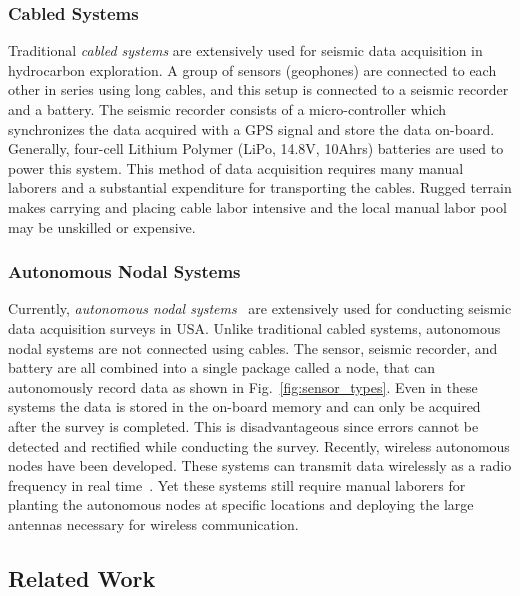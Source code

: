 \subsubsection{Cabled Systems}
 Traditional \emph{cabled systems} are extensively used for seismic data acquisition in hydrocarbon exploration. A group of sensors (geophones) are connected to each other in series using long cables, and this setup is connected to a seismic recorder and a battery. The seismic recorder consists of a micro-controller which synchronizes the data acquired with a GPS signal and store the data on-board. Generally, four-cell Lithium Polymer (LiPo, 14.8V, 10Ahrs) batteries are used to power this system. This method of data acquisition requires many manual laborers and a substantial expenditure for transporting the cables. 
 Rugged terrain makes carrying and placing cable labor intensive and the local manual labor pool may be unskilled or expensive.
   
 \subsubsection{Autonomous Nodal Systems}
 Currently, \emph{autonomous nodal systems}~\cite{wood1998distributed} are extensively used for conducting seismic data acquisition surveys in USA. Unlike traditional cabled systems, autonomous nodal systems are not connected using cables. The sensor, seismic recorder, and battery are all combined into a single package called a node, that can autonomously record data as shown in Fig.~\ref{fig:sensor_types}. Even in these systems the data is stored in the on-board memory and can only be acquired after the survey is completed. This is disadvantageous since errors cannot be detected and rectified while conducting the survey. Recently, wireless autonomous nodes have been developed. These systems can transmit data wirelessly as a radio frequency in real time~\cite{jiang2015geophysical}. Yet these systems still require manual laborers for planting the autonomous nodes at specific locations and deploying the large antennas necessary for wireless communication.
 
\subsection{Related Work}

